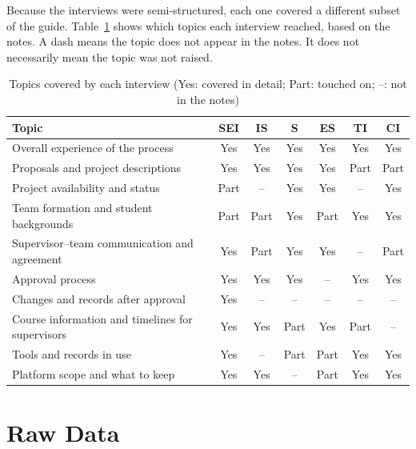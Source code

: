 \documentclass{article}
\begin{document}
    Because the interviews were semi-structured, each one covered a different
    subset of the guide. Table~\ref{tab:coverage} shows which topics each interview reached,
    based on the notes. A dash means the topic does not appear in the notes. It does not
    necessarily mean the topic was not raised.

    \begin{table}[h!]
        \centering
        \small
        \renewcommand{\arraystretch}{1.15}
        \begin{tabularx}{\textwidth}{>{\raggedright\arraybackslash}X c c c c c c}
            \toprule
            \textbf{Topic} & \textbf{SEI} & \textbf{IS} & \textbf{S} & \textbf{ES} & \textbf{TI} & \textbf{CI}\\
            \midrule
            Overall experience of the process & Yes & Yes & Yes & Yes & Yes & Yes\\
            Proposals and project descriptions & Yes & Yes & Yes & Yes & Part & Part\\
            Project availability and status & Part & -- & Yes & Yes & -- & Yes\\
            Team formation and student backgrounds & Part & Part & Yes & Part & Yes & Yes\\
            Supervisor--team communication and agreement & Yes & Part & Yes & Yes & -- & Part\\
            Approval process & Yes & Yes & Yes & -- & Yes & Yes\\
            Changes and records after approval & Yes & -- & -- & -- & -- & --\\
            Course information and timelines for supervisors & Yes & Yes & Part & Yes & Part & --\\
            Tools and records in use & Yes & -- & Part & Part & Yes & Yes\\
            Platform scope and what to keep & Yes & Yes & -- & Part & Yes & Yes\\
            \bottomrule
        \end{tabularx}
        \caption{Topics covered by each interview (Yes: covered in detail; Part: touched on; --: not in the notes)}
        \label{tab:coverage}
    \end{table}

    \section{Raw Data}
    \label{sec:raw}
\end{document}
